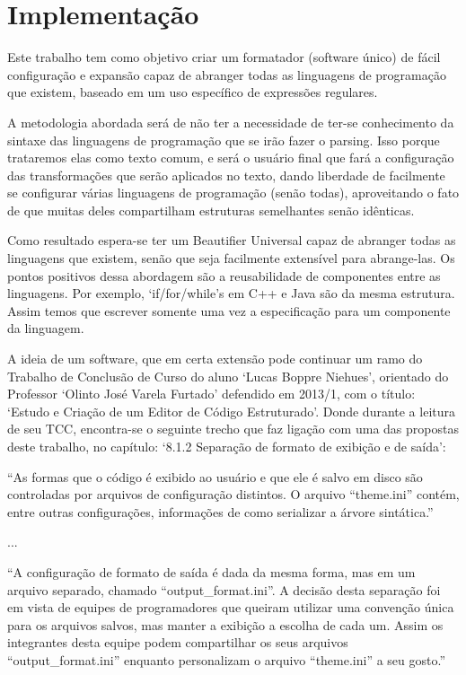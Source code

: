 



\section{Implementação}

    Este trabalho tem como objetivo criar um formatador (software único) de fácil configuração e
    expansão capaz de abranger todas as linguagens de programação que existem, baseado em um uso
    específico de expressões regulares.

    A metodologia abordada será de não ter a necessidade de ter-se conhecimento da sintaxe das
    linguagens de programação que se irão fazer o parsing. Isso porque trataremos elas como texto
    comum, e será o usuário final que fará a configuração das transformações que serão aplicados no
    texto, dando liberdade de facilmente se configurar várias linguagens de programação (senão
    todas), aproveitando o fato de que muitas deles compartilham estruturas semelhantes senão
    idênticas.

    Como resultado espera-se ter um Beautifier Universal capaz de abranger todas as linguagens que
    existem, senão que seja facilmente extensível para abrange-las. Os pontos positivos dessa
    abordagem são a reusabilidade de componentes entre as linguagens. Por exemplo, `if/for/while's
    em C++ e Java são da mesma estrutura. Assim temos que escrever somente uma vez a especificação
    para um componente da linguagem.

    A ideia de um software, que em certa extensão pode continuar um ramo do Trabalho de Conclusão de
    Curso do aluno `Lucas Boppre Niehues', orientado do Professor `Olinto José Varela Furtado'
    defendido em 2013/1, com o título: `Estudo e Criação de um Editor de Código Estruturado'. Donde
    durante a leitura de seu TCC, encontra-se o seguinte trecho que faz ligação com uma das
    propostas deste trabalho, no capítulo: `8.1.2 Separação de formato de exibição e de saída':

    \medskip
    \begin{myquote}
    ``As formas que o código é exibido ao usuário e que ele é salvo em disco são controladas
    por arquivos de configuração distintos. O arquivo ``theme.ini'' contém, entre outras
    configurações, informações de como serializar a árvore sintática.''
    \end{myquote}

    \vspace{-5mm}
    ...
    \begin{myquote}
    ``A configuração de formato de saída é dada da mesma forma, mas em um arquivo
    separado, chamado ``output\_format.ini''. A decisão desta separação foi em vista de equipes
    de programadores que queiram utilizar uma convenção única para os arquivos salvos,
    mas manter a exibição a escolha de cada um. Assim os integrantes desta equipe podem
    compartilhar os seus arquivos ``output\_format.ini'' enquanto personalizam o arquivo
    ``theme.ini'' a seu gosto.''
    \end{myquote}

